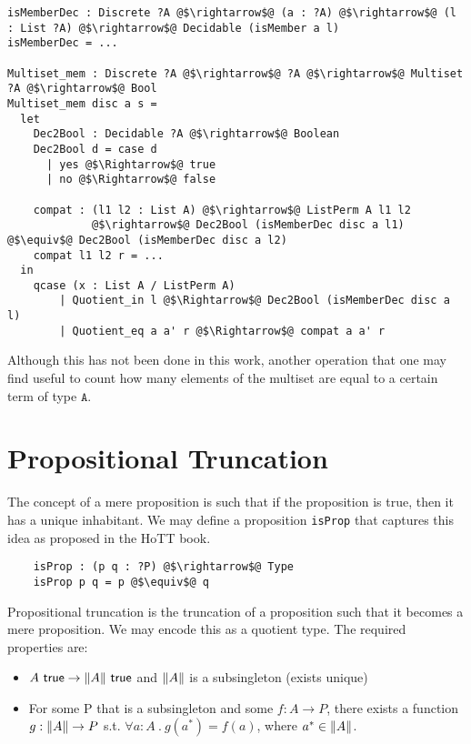 \documentclass[12pt,twoside,maitrise]{dms}
\theoremstyle{definition}
\numberwithin{equation}{section}
\numberwithin{table}{chapter}
\numberwithin{figure}{chapter}
\DeclarePairedDelimiter{\norm}{\lVert}{\rVert}
\newcommand\kw[1] {\textsf{#1}}
\newcommand\id[1] {\texttt{#1}}
\newcommand\fn[1] {\texttt{#1}}
\begin{document}
\begin{verbatim}
isMemberDec : Discrete ?A @$\rightarrow$@ (a : ?A) @$\rightarrow$@ (l : List ?A) @$\rightarrow$@ Decidable (isMember a l)
isMemberDec = ...

Multiset_mem : Discrete ?A @$\rightarrow$@ ?A @$\rightarrow$@ Multiset ?A @$\rightarrow$@ Bool
Multiset_mem disc a s =
  let
    Dec2Bool : Decidable ?A @$\rightarrow$@ Boolean
    Dec2Bool d = case d
      | yes @$\Rightarrow$@ true
      | no @$\Rightarrow$@ false

    compat : (l1 l2 : List A) @$\rightarrow$@ ListPerm A l1 l2
             @$\rightarrow$@ Dec2Bool (isMemberDec disc a l1) @$\equiv$@ Dec2Bool (isMemberDec disc a l2)
    compat l1 l2 r = ...
  in
    qcase (x : List A / ListPerm A)
        | Quotient_in l @$\Rightarrow$@ Dec2Bool (isMemberDec disc a l)
        | Quotient_eq a a' r @$\Rightarrow$@ compat a a' r
\end{verbatim}

Although this has not been done in this work, another operation that one may find
useful to  count how many elements of the multiset are equal to
a certain term of type $\fn{A}$.

\section{Propositional Truncation}\label{sec:prop-trunc}

The concept of a mere proposition is such that if the proposition is true, then
it has a unique inhabitant. We may define a proposition \id{isProp} that
captures this idea as proposed in the HoTT book\cite[Chap~3.3]{HoTTbook}.

\begin{verbatim}
    isProp : (p q : ?P) @$\rightarrow$@ Type
    isProp p q = p @$\equiv$@ q
\end{verbatim}

Propositional truncation is the truncation of a proposition such that it becomes
a mere proposition. We may encode this as a quotient type. The required properties
are:

\begin{itemize}
	\item $A \ \kw{true} \rightarrow \norm{A} \ \kw{true}$ and $\norm{A}$
      is a subsingleton (exists unique)
	\item For some P that is a subsingleton and some $f : A \rightarrow P$, there exists a function $g : \norm{A} \rightarrow P$ s.t. $ \forall a : A \ . \ g(a^*) = f(a)$, where $a^* \in \norm{A}$.
\end{itemize}
\end{document}

